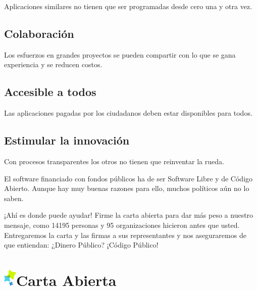 \documentclass[10pt,foldmark,tumble]{leaflet}
\begin{document}
Aplicaciones similares no tienen que ser programadas desde cero una y otra vez.

\subsection{Colaboración}

Los esfuerzos en grandes proyectos se pueden compartir con lo que se gana experiencia y se reducen costos.

\subsection{Accesible a todos}

Las aplicaciones pagadas por los ciudadanos deben estar disponibles para todos.

\subsection{Estimular la innovación}

Con procesos transparentes los otros no tienen que reinventar la rueda.

\vspace{1em}

El software financiado con fondos públicos ha de ser Software Libre y de Código Abierto. Aunque hay muy buenas razones para ello, muchos políticos aún no lo saben.

\vspace{2em}

\begin{mdframed}[style=MyFrame]
\end{mdframed}


\vspace{2em}

¡Ahí es donde puede ayudar! Firme la carta abierta para dar más peso a nuestro mensaje, como 14195 personas y 95 organizaciones hicieron antes que usted. Entregaremos la carta y las firmas a sus representantes y nos aseguraremos de que entiendan: ¿Dinero Público? ¡Código Público!



\section{\includegraphics{item.png}Carta Abierta}
\end{document}
